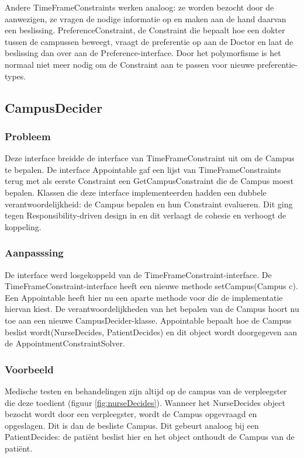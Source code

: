 Andere TimeFrameConstraints werken analoog: ze worden bezocht door de aanwezigen, ze vragen de nodige informatie op en maken aan de hand daarvan een beslissing. 
PreferenceConstraint, de Constraint die bepaalt hoe een dokter tussen de campussen beweegt, vraagt de preferentie op aan de Doctor en laat de beslissing dan over aan de Preference-interface. 
Door het polymorfisme is het normaal niet meer nodig om de Constraint aan te passen voor nieuwe preferentie-types.


\subsection{CampusDecider}
\subsubsection{Probleem}
Deze interface breidde de interface van TimeFrameConstraint uit om de Campus te bepalen. 
De interface Appointable gaf een lijst van TimeFrameConstraints terug met als eerste Constraint een GetCampusConstraint die de Campus moest bepalen. 
Klassen die deze interface implementeerden hadden een dubbele verantwoordelijkheid: 
de Campus bepalen en hun Constraint evalueren. Dit ging tegen Responsibility-driven design in en dit verlaagt de cohesie en verhoogt de koppeling.

\subsubsection{Aanpasssing}
De interface werd losgekoppeld van de TimeFrameConstraint-interface. 
De TimeFrameConstraint-interface heeft een nieuwe methode setCampus(Campus c). 
Een Appointable heeft hier nu een aparte methode voor die de implementatie hiervan kiest. 
De verantwoordelijkheden van het bepalen van de Campus hoort nu toe aan een nieuwe CampusDecider-klasse.
Appointable bepaalt hoe de Campus beslist wordt(NurseDecides, PatientDecides) en dit object wordt doorgegeven aan de AppointmentConstraintSolver. 

\subsubsection{Voorbeeld}
Medische testen en behandelingen zijn altijd op de campus van de verpleegster die deze toedient (figuur \ref{fig:nurseDecides}). 
Wanneer het NurseDecides object bezocht wordt door een verpleegster, wordt de Campus opgevraagd en opgeslagen. 
Dit is dan de besliste Campus. Dit gebeurt analoog bij een PatientDecides: de patiënt beslist hier en het object onthoudt de Campus van de patiënt.

